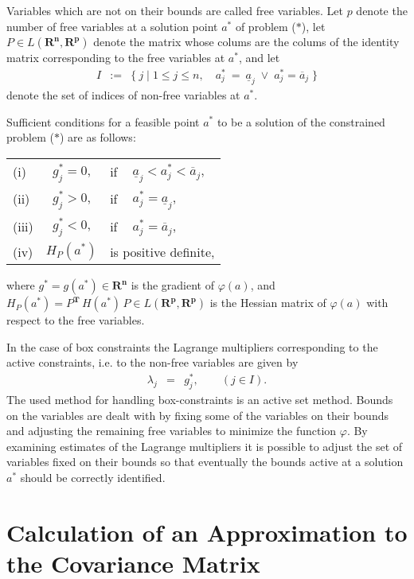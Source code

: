 Variables which are not on their bounds are called free variables.
Let $p$ denote the number of free variables at a solution
point $a^*$ of problem ($*$), let
$P \in L(\mathbf{R^n},\mathbf{R^p})$ denote the matrix
whose colums are the colums of the identity matrix corresponding to the
free variables at $a^*$, and let
\begin{eqnarray*}
 I & := & \{\:j\;|\;1 \le j \le n, \quad
  a_j^* \ = \ \underline{a}_j \; \vee \; a_j^* = \overline{a}_j\;\}
\end{eqnarray*}
denote the set of indices of non-free variables at $a^*$.
\par
Sufficient conditions for a feasible point $a^*$ to be a
solution of the constrained problem ($*$) are as follows: \\[2mm]
\begin{tabular}{l@{\qquad}c@{\qquad}l@{\quad}l}
(i)   & $g_j^* = 0$, & if &
$\underline{a}_j < a_j^* < \overline{a}_j$, \\
(ii)  & $g_j^* > 0$, & if & $a_j^* = \underline{a}_j$, \\
(iii) & $g_j^* < 0$, & if & $a_j^* = \overline{a}_j$, \\
(iv)  & $H_P(a^*)$ & \multicolumn{2}{l}{is positive definite,}
\end{tabular}
\par
where $g^* = g(a^*) \in \mathbf{R^n}$ is the gradient of $\varphi (a)$,
and $H_P(a^*)=P^{\mathbf{T}}\,H(a^*)\,P \in L(\mathbf{R^p},\mathbf{R^p})$
is the Hessian matrix of $\varphi (a)$ with respect to the free
variables.
\par
In the case of box constraints the Lagrange multipliers corresponding to
the active constraints, i.e. to the non-free variables are given by
\begin{eqnarray*}
\lambda_j & = & g_j^*, \qquad (j \in I).
\end{eqnarray*}
The used method for handling box-constraints is an active set method.
Bounds on the variables are dealt with by fixing some of the variables
on their bounds and adjusting the remaining free variables to minimize
the function $\varphi$. By examining estimates of the
Lagrange multipliers it is possible to adjust the set of variables fixed
on their bounds so that eventually the bounds active at a solution $a^*$
should be correctly identified. \\ [5mm]
 

\newpage
\section{Calculation of an Approximation to the Covariance Matrix}
 
